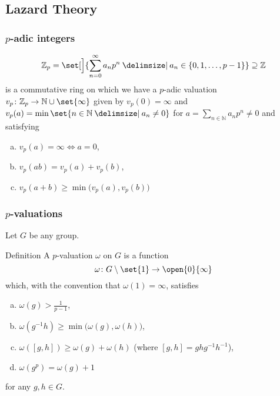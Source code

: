 \documentclass{beamer}
\newcommand*\N{\mathbb{N}}
\newcommand*\Z{\mathbb{Z}}
\newcommand*\setSymbol[1][]{
  \nonscript\:#1\vert\allowbreak\nonscript\:\mathopen{}
}
\providecommand\given{}
\renewcommand*\given{\setSymbol[\delimsize]}
\begin{document}

\subsection{Lazard Theory}

\begin{frame}
  \frametitle{$p$-adic integers}

  \[
    \Z_p = \set[\Big]{\sum_{n=0}^\infty a_np^n \given a_n \in \{0,1,\dotsc,p-1\}} \supseteq \Z
  \]
  is a commutative ring on which we have a $p$-adic valuation $v_p \colon \Z_p \to \N \cup \set{\infty}$ given by $v_p(0) = \infty$ and $v_p(a) = \min \set{n \in \N \given a_n \neq 0}$ for $a = \sum_{n \in \N} a_np^n \neq 0$ and satisfying

  \begin{enumerate}[(a)]
  \item $v_p(a) = \infty \Longleftrightarrow a=0$,
  \item $v_p(ab) = v_p(a) + v_p(b)$,
  \item $v_p(a+b) \geq \min\bigl( v_p(a),v_p(b) \bigr)$
  \end{enumerate}
\end{frame}

\begin{frame}
  \frametitle{$p$-valuations}

  Let $G$ be any group.
  \begin{block}{Definition}
    A $p$-valuation $\omega$ on $G$ is a function \[\omega \colon G\setminus\set{1} \to \open{0}{\infty}\] which, with the convention that $\omega(1) = \infty$, satisfies

    \begin{enumerate}[(a)]
      \item $\omega(g) > \frac{1}{p-1}$,
      \item $\omega(g^{-1}h) \geq \min\bigl( \omega(g),\omega(h) \bigr)$,
      \item $\omega([g,h]) \geq \omega(g) + \omega(h)$  (where $[g,h] = ghg^{-1}h^{-1}$),
      \item $\omega(g^p) = \omega(g) + 1$
    \end{enumerate}
    for any $g,h \in G$.
  \end{block}
\end{frame}
\end{document}
